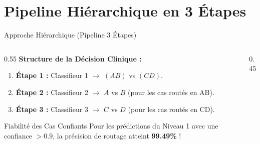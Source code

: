 \documentclass[10pt, compress]{beamer}
\begin{document}
\section{Pipeline Hiérarchique en 3 Étapes}

\begin{frame}{Approche Hiérarchique (Pipeline 3 Étapes)}
    \begin{columns}
        \begin{column}{0.55\textwidth}
            \textbf{Structure de la Décision Clinique :}
            \begin{enumerate}
                \item \textbf{Étape 1 :} Classifieur 1 $\rightarrow$ $(AB)$ vs $(CD)$.
                \item \textbf{Étape 2 :} Classifieur 2 $\rightarrow$ $A$ vs $B$ (pour les cas routés en AB).
                \item \textbf{Étape 3 :} Classifieur 3 $\rightarrow$ $C$ vs $D$ (pour les cas routés en CD).
            \end{enumerate}
            \begin{exampleblock}{Fiabilité des Cas Confiants}
                Pour les prédictions du Niveau 1 avec une confiance $>0.9$, la précision de routage atteint \textbf{99.49\%} !
            \end{exampleblock}
        \end{column}
        \begin{column}{0.45\textwidth}
            \begin{table}[h]
                \centering
                \caption{Résultats par niveau du pipeline.}
            \end{table}
        \end{column}
    \end{columns}
\end{frame}
\end{document}
